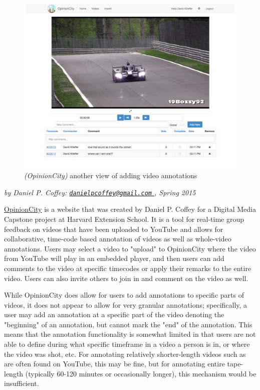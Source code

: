 \begin{figure}[ht]
	\includegraphics[width=\textwidth]{gfx/opinion-city/car2.pdf}
	\caption{\textit{(OpinionCity)} another view of adding video annotations} 
	\label{fig:opinioncity:adding-video-annotations-view2}
\end{figure}

\textit{by Daniel P. Coffey: \href{mailto:danielpcoffey@gmail.com}{\nolinkurl{danielpcoffey@gmail.com} }, Spring 2015}

\href{http://opinion.city}{OpinionCity} is a website that was created by Daniel P. Coffey for a Digital Media Capstone project at Harvard Extension School.  It is a tool for real-time group feedback on videos that have been uploaded to YouTube and allows for collaborative, time-code based annotation of videos as well as whole-video annotations.  Users may select a video to "upload" to OpinionCity where the video from YouTube will play in an embedded player, and then users can add comments to the video at specific timecodes or apply their remarks to the entire video.  Users can also invite others to join in and comment on the video as well. 

While OpinionCity does allow for users to add annotations to specific parts of videos, it does not appear to allow for very granular annotations; specifically, a user may add an annotation at a specific part of the video denoting the "beginning" of an annotation, but cannot mark the "end" of the annotation.  This means that the annotation functionality is somewhat limited in that users are not able to define during what specific timeframe in a video a person is in, or where the video was shot, etc.  For annotating relatively shorter-length videos such as are often found on YouTube, this may be fine, but for annotating entire tape-length (typically 60-120 minutes or occasionally longer), this mechanism would be insufficient. 

